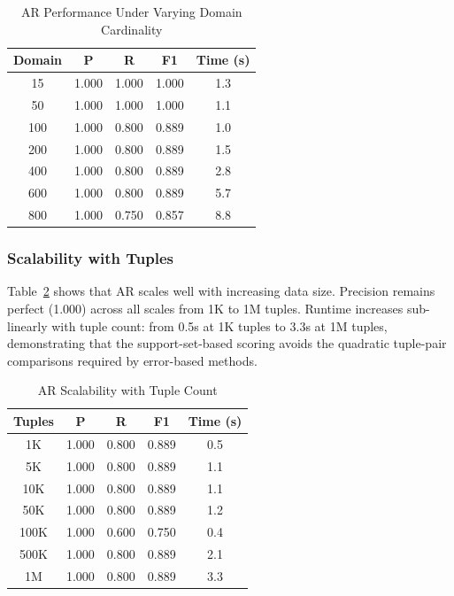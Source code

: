 \documentclass[conference]{IEEEtran}
\begin{document}
\begin{table}[t]
\caption{AR Performance Under Varying Domain Cardinality}
\label{tab:domain}
\centering
\begin{tabular}{ccccc}
\toprule
\textbf{Domain} & \textbf{P} & \textbf{R} & \textbf{F1} & \textbf{Time (s)} \\
\midrule
15 & 1.000 & 1.000 & 1.000 & 1.3 \\
50 & 1.000 & 1.000 & 1.000 & 1.1 \\
100 & 1.000 & 0.800 & 0.889 & 1.0 \\
200 & 1.000 & 0.800 & 0.889 & 1.5 \\
400 & 1.000 & 0.800 & 0.889 & 2.8 \\
600 & 1.000 & 0.800 & 0.889 & 5.7 \\
800 & 1.000 & 0.750 & 0.857 & 8.8 \\
\bottomrule
\end{tabular}
\end{table}

\subsubsection{Scalability with Tuples}
Table~\ref{tab:tuples} shows that AR scales well with increasing data size. Precision remains perfect (1.000) across all scales from 1K to 1M tuples. Runtime increases sub-linearly with tuple count: from 0.5s at 1K tuples to 3.3s at 1M tuples, demonstrating that the support-set-based scoring avoids the quadratic tuple-pair comparisons required by error-based methods.

\begin{table}[t]
\caption{AR Scalability with Tuple Count}
\label{tab:tuples}
\centering
\begin{tabular}{ccccc}
\toprule
\textbf{Tuples} & \textbf{P} & \textbf{R} & \textbf{F1} & \textbf{Time (s)} \\
\midrule
1K & 1.000 & 0.800 & 0.889 & 0.5 \\
5K & 1.000 & 0.800 & 0.889 & 1.1 \\
10K & 1.000 & 0.800 & 0.889 & 1.1 \\
50K & 1.000 & 0.800 & 0.889 & 1.2 \\
100K & 1.000 & 0.600 & 0.750 & 0.4 \\
500K & 1.000 & 0.800 & 0.889 & 2.1 \\
1M & 1.000 & 0.800 & 0.889 & 3.3 \\
\bottomrule
\end{tabular}
\end{table}
\end{document}
